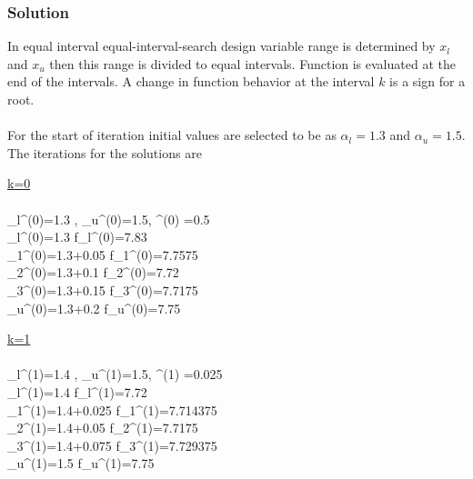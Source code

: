 \documentclass[]{report}
\begin{document}
\subsubsection*{Solution}
In equal interval equal-interval-search design variable range is determined by $x_l$ and $x_u$ then this range is divided to equal intervals. Function is evaluated at the end of the intervals. A change in function behavior at the interval $k$ is a sign for a root.
\\
\\
For the start of iteration initial values are selected to be as $\alpha_l=1.3$ and $\alpha_u=1.5$. The iterations for the solutions are
\begin{program}
\underline{k=0}
\\
\\
\alpha_l^{(0)}=1.3 \; ,\; \alpha_u^{(0)}=1.5, \delta^{(0)} =0.5\\
\alpha_l^{(0)}=1.3 \; \Longrightarrow f_l^{(0)}=7.83\\
\alpha_1^{(0)}=1.3+0.05 \; \Longrightarrow f_1^{(0)}=7.7575\\
\alpha_2^{(0)}=1.3+0.1 \; \Longrightarrow f_2^{(0)}=7.72\\
\alpha_3^{(0)}=1.3+0.15 \; \Longrightarrow f_3^{(0)}=7.7175\\
\alpha_u^{(0)}=1.3+0.2 \; \Longrightarrow f_u^{(0)}=7.75
\end{program}
\begin{program}
\underline{k=1}
\\
\\
\alpha_l^{(1)}=1.4 \; ,\; \alpha_u^{(1)}=1.5, \delta^{(1)} =0.025\\
\alpha_l^{(1)}=1.4 \; \Longrightarrow f_l^{(1)}=7.72\\
\alpha_1^{(1)}=1.4+0.025 \; \Longrightarrow f_1^{(1)}=7.714375\\
\alpha_2^{(1)}=1.4+0.05 \; \Longrightarrow f_2^{(1)}=7.7175\\
\alpha_3^{(1)}=1.4+0.075 \; \Longrightarrow f_3^{(1)}=7.729375\\
\alpha_u^{(1)}=1.5 \; \Longrightarrow f_u^{(1)}=7.75
\end{program}
\end{document}
